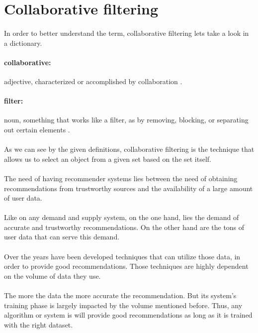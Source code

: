 \section{Collaborative filtering}
\paragraph{} In order to better understand the term, collaborative filtering lets take a look in a dictionary.
\paragraph{collaborative:} adjective, characterized or accomplished by collaboration \cite{Dictionary.com2017}.
\paragraph{filter:} noun, something that works like a filter, as by removing, blocking, or separating out certain elements \cite{Dictionary.com2017}.
\paragraph{} As we can see by the given definitions, collaborative filtering is the technique that allows us to select an object from a given set based on the set itself.
\paragraph{}The need of having recommender systems lies between the need of obtaining recommendations from trustworthy sources and the availability of a large amount of user data.
\paragraph{}Like on any demand and supply system, on the one hand, lies the demand of accurate and trustworthy recommendations. On the other hand are the tons of user data that can serve this demand.
\paragraph{}Over the years have been developed techniques that can utilize those data, in order to provide good recommendations. Those techniques are highly dependent on the volume of data they use. 

\paragraph{}The more the data the more accurate the recommendation. But its system's training phase is largely impacted by the volume mentioned before. Thus, any algorithm or system is will provide good recommendations as long as it is trained with the right dataset.

